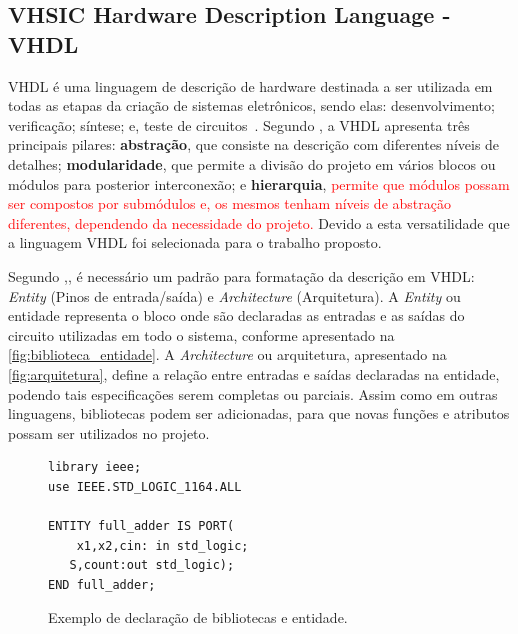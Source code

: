 

\subsection{\label{sec:vhdl_seção}VHSIC Hardware Description Language - VHDL}

VHDL é uma linguagem de descrição de hardware destinada a ser utilizada em todas as etapas da criação de sistemas eletrônicos, sendo elas: desenvolvimento; verificação; síntese; e, teste de circuitos~\cite{IEEEVHDLLanguage}.
% 
Segundo \cite{cappelattipraticando}, a VHDL apresenta três principais pilares: \textbf{abstração}, que consiste na descrição com diferentes níveis de detalhes; \textbf{modularidade}, que permite a divisão do projeto em vários blocos ou módulos para posterior interconexão; e \textbf{hierarquia}, \textcolor{red}{permite que módulos possam ser compostos por submódulos e, os mesmos tenham níveis de abstração diferentes, dependendo da necessidade do projeto.} Devido a esta versatilidade que a linguagem VHDL foi selecionada para o trabalho proposto.

\par
Segundo \citeauthor{IEEEVHDLLanguage},\citeyear{IEEEVHDLLanguage}, é necessário um padrão para formatação da descrição em VHDL: \textit{Entity} (Pinos de entrada/saída) e \textit{Architecture} (Arquitetura). A \textit{Entity} ou entidade representa o bloco onde são declaradas as entradas e as saídas do circuito utilizadas em todo o sistema, conforme apresentado na \autoref{fig:biblioteca_entidade}. A \textit{Architecture} ou arquitetura, apresentado na \autoref{fig:arquitetura}, define a relação entre entradas e saídas declaradas na entidade, podendo tais especificações serem completas ou parciais. Assim como em outras linguagens, bibliotecas podem ser adicionadas, para que novas funções e atributos possam ser utilizados no projeto.

\begin{figure}[!htp]
\caption{\label{fig:biblioteca_entidade} Exemplo de declaração de bibliotecas e entidade.}
	\begin{center}
    \begin{minipage}{0.6\textwidth}
    \begin{lstlisting}       
library ieee;
use IEEE.STD_LOGIC_1164.ALL

ENTITY full_adder IS PORT(
	x1,x2,cin: in std_logic;
   S,count:out std_logic);
END full_adder;
\end{lstlisting}
    \end{minipage}
	\end{center}
\end{figure}

